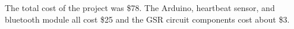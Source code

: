 \documentclass[finalProposal.tex]{subfiles}
\begin{document}
\onehalfspacing


\bigskip

The total cost of the project was \$78. The Arduino, heartbeat sensor, and bluetooth module all cost \$25 and the GSR circuit components cost about \$3.
\end{document}
